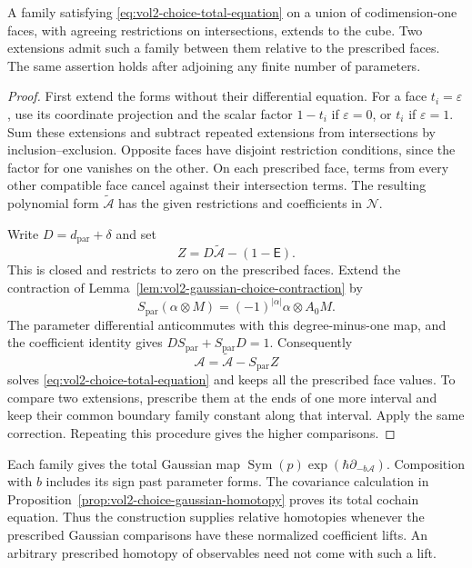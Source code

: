 \begin{theorem}\label{thm:vol2-choice-relative-fillers}
A family satisfying \eqref{eq:vol2-choice-total-equation}
on a union of codimension-one faces, with agreeing
restrictions on intersections, extends to the cube.
Two extensions admit such a family between them
relative to the prescribed faces. The same assertion
holds after adjoining any finite number of parameters.
\end{theorem}
\begin{proof}
First extend the forms without their differential
equation. For a face $t_i=\varepsilon$, use its coordinate
projection and the scalar factor $1-t_i$ if
$\varepsilon=0$, or $t_i$ if $\varepsilon=1$.
Sum these extensions and subtract repeated extensions
from intersections by inclusion--exclusion. Opposite
faces have disjoint restriction conditions, since the
factor for one vanishes on the other. On each prescribed
face, terms from every other compatible face cancel
against their intersection terms. The resulting
polynomial form $\widetilde{\mathcal A}$ has the given
restrictions and coefficients in $\mathcal N$.

Write $D=d_{\mathrm{par}}+\delta$ and set
\[
 Z=D\widetilde{\mathcal A}-(1-\mathsf E).
\]
This is closed and restricts to zero on the prescribed
faces. Extend the contraction of
Lemma~\ref{lem:vol2-gaussian-choice-contraction} by
\[
 S_{\mathrm{par}}(\alpha\otimes M)
             =(-1)^{|\alpha|}\alpha\otimes A_0M.
\]
The parameter differential anticommutes with this
degree-minus-one map, and the coefficient identity
gives $DS_{\mathrm{par}}+S_{\mathrm{par}}D=1$.
Consequently
\begin{equation}\label{eq:vol2-choice-relative-correction}
 \mathcal A=\widetilde{\mathcal A}-S_{\mathrm{par}}Z
\end{equation}
solves \eqref{eq:vol2-choice-total-equation} and keeps
all the prescribed face values. To compare two
extensions, prescribe them at the ends of one more
interval and keep their common boundary family
constant along that interval. Apply the same correction.
Repeating this procedure gives the higher comparisons.
\end{proof}

Each family gives the total Gaussian map
$\operatorname{Sym}(p)\exp(\hbar\partial_{-b\mathcal A})$.
Composition with $b$ includes its sign past parameter
forms. The covariance calculation in
Proposition~\ref{prop:vol2-choice-gaussian-homotopy}
proves its total cochain equation. Thus the construction
supplies relative homotopies whenever the prescribed
Gaussian comparisons have these normalized coefficient
lifts. An arbitrary prescribed homotopy of observables
need not come with such a lift.

